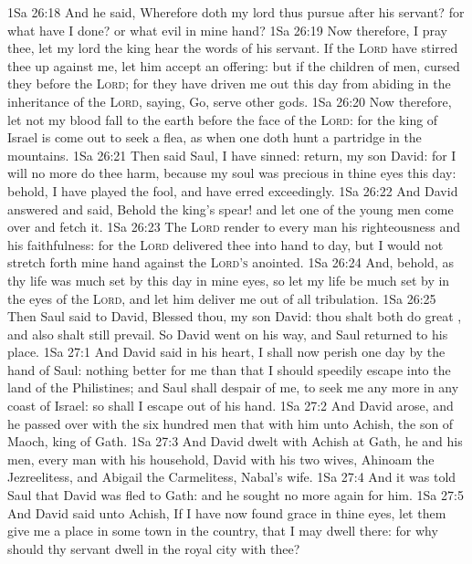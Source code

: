 \vs 1Sa 26:18 And he said, Wherefore doth my lord thus pursue after his servant? for what have I done? or what evil  in mine hand?
\vs 1Sa 26:19 Now therefore, I pray thee, let my lord the king hear the words of his servant. If the \textsc{Lord} have stirred thee up against me, let him accept an offering: but if  the children of men, cursed  they before the \textsc{Lord}; for they have driven me out this day from abiding in the inheritance of the \textsc{Lord}, saying, Go, serve other gods.
\vs 1Sa 26:20 Now therefore, let not my blood fall to the earth before the face of the \textsc{Lord}: for the king of Israel is come out to seek a flea, as when one doth hunt a partridge in the mountains.
\vs 1Sa 26:21 Then said Saul, I have sinned: return, my son David: for I will no more do thee harm, because my soul was precious in thine eyes this day: behold, I have played the fool, and have erred exceedingly.
\vs 1Sa 26:22 And David answered and said, Behold the king's spear! and let one of the young men come over and fetch it.
\vs 1Sa 26:23 The \textsc{Lord} render to every man his righteousness and his faithfulness: for the \textsc{Lord} delivered thee into  hand to day, but I would not stretch forth mine hand against the \textsc{Lord's} anointed.
\vs 1Sa 26:24 And, behold, as thy life was much set by this day in mine eyes, so let my life be much set by in the eyes of the \textsc{Lord}, and let him deliver me out of all tribulation.
\vs 1Sa 26:25 Then Saul said to David, Blessed  thou, my son David: thou shalt both do great , and also shalt still prevail. So David went on his way, and Saul returned to his place.
\vs 1Sa 27:1 And David said in his heart, I shall now perish one day by the hand of Saul:  nothing better for me than that I should speedily escape into the land of the Philistines; and Saul shall despair of me, to seek me any more in any coast of Israel: so shall I escape out of his hand.
\vs 1Sa 27:2 And David arose, and he passed over with the six hundred men that  with him unto Achish, the son of Maoch, king of Gath.
\vs 1Sa 27:3 And David dwelt with Achish at Gath, he and his men, every man with his household,  David with his two wives, Ahinoam the Jezreelitess, and Abigail the Carmelitess, Nabal's wife.
\vs 1Sa 27:4 And it was told Saul that David was fled to Gath: and he sought no more again for him.
\vs 1Sa 27:5 And David said unto Achish, If I have now found grace in thine eyes, let them give me a place in some town in the country, that I may dwell there: for why should thy servant dwell in the royal city with thee?
